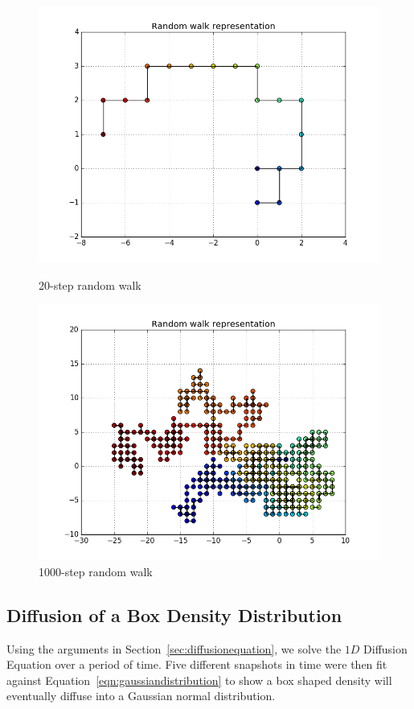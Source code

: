 \documentclass[10pt]{article}
\begin{document}
\begin{figure}[!htb]
  \includegraphics[width=\linewidth]{run20.png}
  \caption{20-step random walk}\label{fig:20steps}
\endminipage\hfill
{}
  \includegraphics[width=\linewidth]{run1000.png}
  \caption{1000-step random walk}\label{fig:1000step}
\endminipage\hfill
\end{figure}

\subsection{Diffusion of a Box Density Distribution}
\label{sec:diffusion-boxdensity}
Using the arguments in Section~\ref{sec:diffusionequation}, we solve the $1D$ Diffusion Equation over a period of time. Five different snapshots in time were then fit against Equation~\ref{eqn:gaussiandistribution} to show a box shaped density will eventually diffuse into a Gaussian normal distribution.

\end{document}
